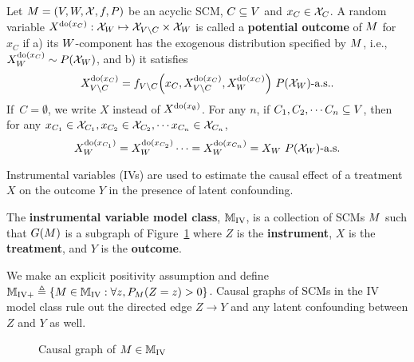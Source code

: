 \begin{definition}
Let $M = {\left({V, W, \mathcal{X}, f,P}\right)}$ be an acyclic SCM, $C \subseteq V$ and $x_C \in \mathcal{X}_{C}$. A random variable $X^{\text{do}(x_C)}: \mathcal{X}_{W} \mapsto \mathcal{X}_{V \backslash C} \times \mathcal{X}_{W}$ is called a \textbf{potential outcome} of $M$ for $x_C$ if a) its $W$-component has the exogenous distribution specified by $M$, i.e., $X^{\text{do}(x_C)}_{W} \sim P{\left({\mathcal{X}_{W}}\right)}$, and b) it satisfies
    \begin{equation*}
        X^{\text{do}(x_C)}_{V \backslash C} = f_{V \backslash C}{\left({x_C,X^{\text{do}(x_C)}_{V \backslash C},X^{\text{do}(x_C)}_{W} }\right)} \text{ $P{\left({\mathcal{X}_{W}}\right)}$-a.s.}.
    \end{equation*}
If $\,C = \emptyset$, we write $X$ instead of $X^{\text{do}(x_{\emptyset})}$. For any $n$, if $C_1, C_2, \cdots C_n \subseteq V$, then for any $x_{C_1} \in {\cal X}_{C_1}, x_{C_2} \in {\cal X}_{C_2}, \cdots x_{C_n} \in {\cal X}_{C_n}$, $$X_{W}^{\text{do}(x_{C_1})} = X_{W}^{\text{do}(x_{C_2})} \cdots =X_{W}^{\text{do}(x_{C_n})} = X_W \text{ $P{\left({\mathcal{X}_{W}}\right)}$-a.s.}$$ 
\end{definition}

Instrumental variables (IVs) are used to estimate the causal effect of a treatment $X$ on the outcome $Y$ in the presence of latent confounding. 
\begin{definition}\label{def:IVmodelclass}
The \textbf{instrumental variable model class}, $\mathbb{M}_{\text{IV}}$, is a collection of SCMs $M$ such that $G{\left({M}\right)}$ is a subgraph of Figure~\ref{fig:iv} where $Z$ is the \textbf{instrument}, $X$ is the \textbf{treatment}, and $Y$ is the \textbf{outcome}. 
\end{definition}
We make an explicit positivity assumption and define $\mathbb{M}_{\text{IV}+} \triangleq \left \{ M \in \mathbb{M}_{\text{IV}}:\forall z, P_{M}(Z=z) > 0 \right\}$. Causal graphs of SCMs in the IV model class rule out the directed edge $Z \rightarrow Y$ and any latent confounding between $Z$ and $Y$ as well. 

\begin{figure}[t]
     \centering
        \caption{Causal graph of $M \in \mathbb{M}_{\text{IV}}$} 
        \label{fig:iv}
        \end{figure}